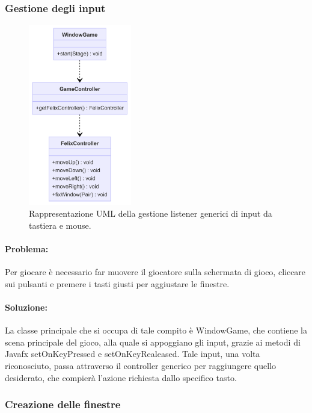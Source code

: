 \documentclass[a4paper,12pt]{report}
\begin{document}
\subsubsection{Gestione degli input }

\begin{figure}[H]
\centering{}
\includegraphics[width=0.4\textwidth]{img/input.png}
\caption{Rappresentazione UML della gestione listener generici di input da tastiera e mouse.}
\end{figure}

\paragraph{Problema:}
Per giocare è necessario far muovere il giocatore sulla schermata di gioco, cliccare sui pulsanti e premere i tasti giusti per aggiustare le finestre.

\paragraph{Soluzione:}
La classe principale che si occupa di tale compito è WindowGame, che contiene la scena principale del gioco, alla quale si appoggiano gli input, grazie ai metodi di Javafx setOnKeyPressed e setOnKeyRealeased.
Tale input, una volta riconosciuto, passa attraverso il controller generico per raggiungere quello desiderato, che compierà l'azione richiesta dallo specifico tasto.

\subsubsection{Creazione delle finestre}
\end{document}
